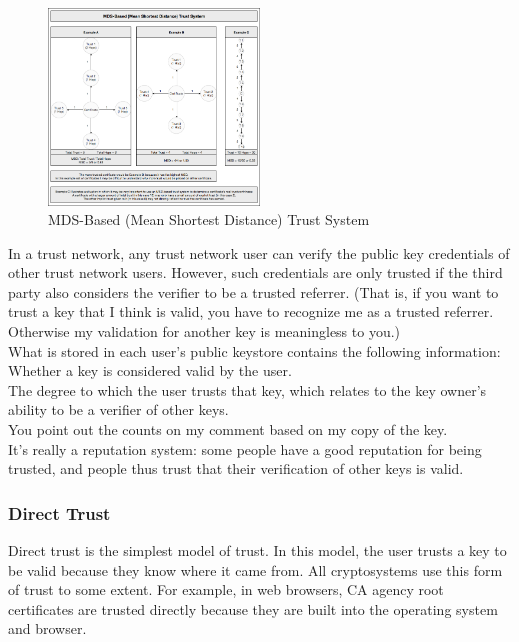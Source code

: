 \begin{figure}[H] %
    \centering %
    \includegraphics[width=0.5\textwidth]{figures/trustSystem.png} %
    \caption{MDS-Based (Mean Shortest Distance) Trust System} %
    \label{Fig.2: MDS-Based (Mean Shortest Distance) Trust System} %
\end{figure}

In a trust network, any trust network user can verify the public key credentials of other 
trust network users. However, such credentials are only trusted if the third party also 
considers the verifier to be a trusted referrer. (That is, if you want to trust a key that 
I think is valid, you have to recognize me as a trusted referrer. Otherwise my validation 
for another key is meaningless to you.)
\\
What is stored in each user's public keystore contains the following information:
\\
Whether a key is considered valid by the user.
\\
The degree to which the user trusts that key, which relates to the key owner's 
ability to be a verifier of other keys.
\\
You point out the counts on my comment based on my copy of the key.
\\
It's really a reputation system: some people have a good reputation for being 
trusted, and people thus trust that their verification of other keys is valid.

\subsubsection{Direct Trust}
Direct trust is the simplest model of trust. In this model, the user trusts a 
key to be valid because they know where it came from\cite{b27}. All cryptosystems use this 
form of trust to some extent. For example, in web browsers, CA agency root 
certificates are trusted directly because they are built into the operating system 
and browser\cite{b28}.

